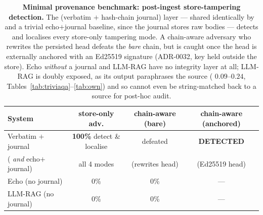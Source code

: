 \begin{table}[tb]
\centering
\caption{\textbf{Minimal provenance benchmark: post-ingest
store-tampering detection.} The (verbatim $+$ hash-chain journal)
layer --- shared identically by \hyphae{} and a trivial
echo$+$journal baseline, since the journal stores raw bodies ---
detects and localises every store-only tampering mode. A
chain-aware adversary who rewrites the persisted head defeats the
\emph{bare} chain, but is caught once the head is externally
anchored with an Ed25519 signature (ADR-0032, key held outside the
store). Echo \emph{without} a journal and LLM-RAG have no
integrity layer at all; LLM-RAG is doubly exposed, as its output
paraphrases the source (\verbpass{} $0.09$--$0.24$,
Tables~\ref{tab:triviaqa}--\ref{tab:own}) and so cannot even be
string-matched back to a source for post-hoc audit.}
\label{tab:tamper}
\small
\begin{tabular}{l c c c}
\toprule
\textbf{System} & store-only adv. & chain-aware (bare) & chain-aware (anchored) \\
\midrule
Verbatim $+$ journal               & \textbf{100\%} detect \& localise & defeated & \textbf{DETECTED} \\
\quad(\hyphae{} \emph{and} echo$+$journal) & all 4 modes & (rewrites head) & (Ed25519 head) \\
Echo (no journal)                  & 0\% & 0\% & --- \\
LLM-RAG (no journal)               & 0\% & 0\% & --- \\
\bottomrule
\end{tabular}
\end{table}

